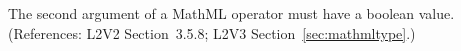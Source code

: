 The second argument of a MathML  operator must have
a boolean value.  (References: L2V2 Section~3.5.8; L2V3
Section~\ref{sec:mathmltype}.)
